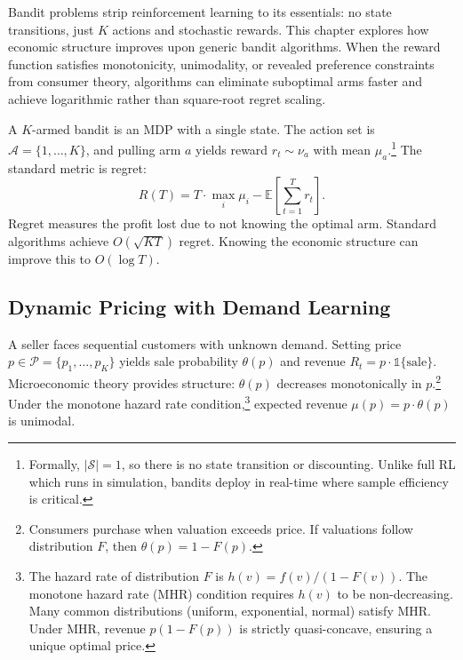Bandit problems strip reinforcement learning to its essentials: no state transitions, just $K$ actions and stochastic rewards. This chapter explores how economic structure improves upon generic bandit algorithms. When the reward function satisfies monotonicity, unimodality, or revealed preference constraints from consumer theory, algorithms can eliminate suboptimal arms faster and achieve logarithmic rather than square-root regret scaling.

A $K$-armed bandit is an MDP with a single state. The action set is $\mathcal{A} = \{1, \ldots, K\}$, and pulling arm $a$ yields reward $r_t \sim \nu_{a}$ with mean $\mu_{a}$.\footnote{Formally, $|\mathcal{S}| = 1$, so there is no state transition or discounting. Unlike full RL which runs in simulation, bandits deploy in real-time where sample efficiency is critical.} The standard metric is regret:
\[
R(T) = T \cdot \max_i \mu_i - \mathbb{E}\left[\sum_{t=1}^T r_t\right].
\]
Regret measures the profit lost due to not knowing the optimal arm. Standard algorithms achieve $O(\sqrt{KT})$ regret. Knowing the economic structure can improve this to $O(\log T)$.

\subsection{Dynamic Pricing with Demand Learning}

A seller faces sequential customers with unknown demand. Setting price $p \in \mathcal{P} = \{p_1, \ldots, p_K\}$ yields sale probability $\theta(p)$ and revenue $R_t = p \cdot \mathbb{1}\{\text{sale}\}$. Microeconomic theory provides structure: $\theta(p)$ decreases monotonically in $p$.\footnote{Consumers purchase when valuation exceeds price. If valuations follow distribution $F$, then $\theta(p) = 1 - F(p)$.} Under the monotone hazard rate condition,\footnote{The hazard rate of distribution $F$ is $h(v) = f(v)/(1-F(v))$. The monotone hazard rate (MHR) condition requires $h(v)$ to be non-decreasing. Many common distributions (uniform, exponential, normal) satisfy MHR. Under MHR, revenue $p(1-F(p))$ is strictly quasi-concave, ensuring a unique optimal price.} expected revenue $\mu(p) = p \cdot \theta(p)$ is unimodal.

